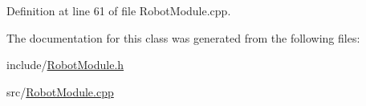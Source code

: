 Definition at line 61 of file Robot\+Module.\+cpp.



The documentation for this class was generated from the following files\+:\begin{DoxyCompactItemize}
\item 
include/\mbox{\hyperlink{_robot_module_8h}{Robot\+Module.\+h}}\item 
src/\mbox{\hyperlink{_robot_module_8cpp}{Robot\+Module.\+cpp}}\end{DoxyCompactItemize}
